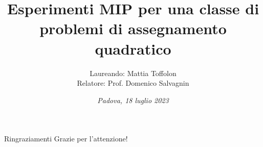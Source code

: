 \documentclass[a4paper]{beamer}
\title[title]{Esperimenti MIP per una classe di\\problemi di assegnamento quadratico}
\author[Persone]{Laureando: Mattia Toffolon\\Relatore: Prof. Domenico Salvagnin}
\date{\small \textit{Padova, 18 luglio 2023}}
\begin{document}
%
\begin{frame}
\maketitle
\end{frame}


\begin{frame}{Ringraziamenti}
\centering
\LARGE Grazie per l'attenzione!
\end{frame}

\begin{frame}
\maketitle
\end{frame}
\end{document}

